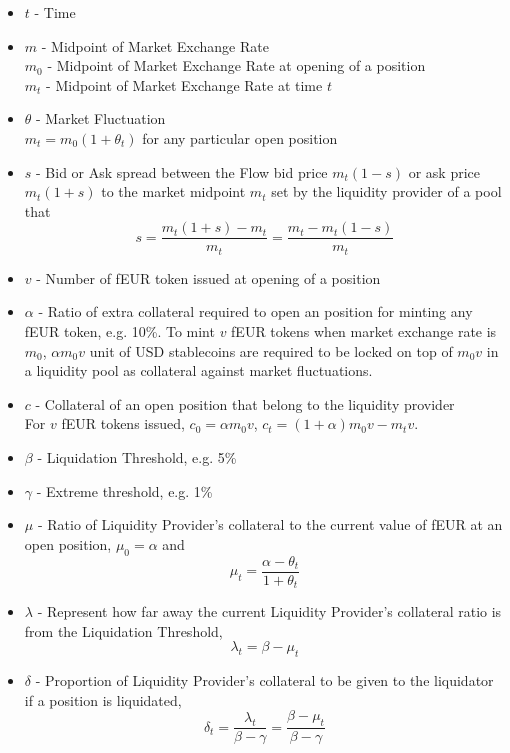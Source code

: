 \documentclass{article}
\begin{document}
\begin{itemize}

  \item $t$ - Time
  
  \item $m$ - Midpoint of Market Exchange Rate\\
  $m_0$ - Midpoint of Market Exchange Rate at opening of a position\\
  $m_t$ - Midpoint of Market Exchange Rate at time $t$
  
  \item $\theta$ - Market Fluctuation\\
  $m_t=m_0(1+\theta_t)$ for any particular open position

  \item $s$ -  Bid or Ask spread between the Flow bid price $m_t(1-s)$ or ask price $m_t(1+s)$ to the market midpoint $m_t$ set by the liquidity provider of a pool that
  $$s=\frac{m_t(1+s)-m_t}{m_t}=\frac{m_t-m_t(1-s)}{m_t}$$

  \item $v$ -  Number of fEUR token issued at opening of a position
  
  \item $\alpha$ - Ratio of extra collateral required to open an position for minting any fEUR token, e.g. 10\%. To mint $v$ fEUR tokens when market exchange rate is $m_0$, $\alpha m_0v$ unit of USD stablecoins are required to be locked on top of $m_0 v$ in a liquidity pool as collateral against market fluctuations. 

  \item $c$ - Collateral of an open position that belong to the liquidity provider\\
  For $v$ fEUR tokens issued, $c_0=\alpha m_0v$, $c_t=(1+\alpha)m_0v - m_tv$. 

  \item $\beta$ - Liquidation Threshold, e.g. 5\%

  \item $\gamma$ - Extreme threshold, e.g. 1\%

  \item $\mu$ - Ratio of Liquidity Provider's collateral to the current value of fEUR at an open position, $\mu_0=\alpha$ and
  $$ \mu_t=\frac{\alpha - \theta_t}{1+\theta_t}$$

  \item $\lambda$ - Represent how far away the current Liquidity Provider's collateral ratio is from the Liquidation Threshold, $$\lambda_t=\beta-\mu_t$$
  
  \item $\delta$ - Proportion of Liquidity Provider's collateral to be given to the liquidator if a position is liquidated, 
  $$ \delta_t=\frac{\lambda_t}{\beta-\gamma}=\frac{\beta-\mu_t}{\beta-\gamma}$$
  
 \end{itemize}
\end{document}
